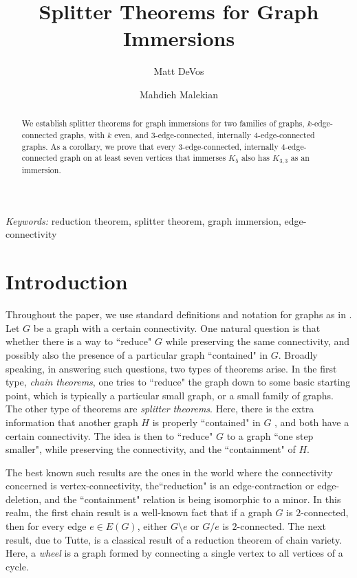 \documentclass[letterpaper,11pt]{article}
\title{Splitter Theorems for Graph Immersions}
\author{Matt DeVos
\and
Mahdieh Malekian}
\date{}
\theoremstyle{definition}
\begin{document}
\maketitle
\begin{abstract}
We establish splitter theorems for graph immersions for two families of graphs, $k$-edge-connected graphs, with $k$ even, and 3-edge-connected, internally 4-edge-connected graphs. As a corollary, we prove that every $3$-edge-connected, internally $4$-edge-connected graph on at least seven vertices that immerses $K_5$ also has $K_{3,3}$ as an immersion.
\end{abstract}

\vspace{0.7cm}
\noindent \emph{Keywords:} {reduction theorem, splitter theorem, graph immersion, edge-connectivity}


\section{Introduction}
\label{intro}


Throughout the paper, we use standard definitions and notation for graphs as in \cite{MR1367739}. Let $G$ be a graph with a certain connectivity. One natural question is that whether there is a way to ``reduce" $G$ while preserving the same connectivity, and possibly also the presence of a particular graph ``contained" in $G$. Broadly speaking, in answering such questions, two types of theorems arise. In the first type, \emph{chain theorems}, one tries to ``reduce" the graph down to some basic starting point, which is typically a particular small graph, or a small family of graphs. The other type of theorems are \emph{splitter theorems}. Here, there is the extra information that another graph $H$ is properly ``contained" in $G$ , and both have a certain connectivity. The idea is then to ``reduce" $G$ to a graph ``one step smaller", while preserving the connectivity, and the ``containment" of $H$.

The best known such results are the ones in the world where the connectivity concerned is vertex-connectivity, the``reduction" is an edge-contraction or edge-deletion, and the ``containment" relation is being isomorphic to a minor. In this realm, the first chain result is a well-known fact that if a graph $G$ is $2$-connected, then for every edge $e \in E(G)$, either $G\setminus e$ or $G/e$ is $2$-connected. The next result, due to Tutte, is a classical result of a reduction theorem of chain variety. Here, a \emph{wheel} is a graph formed by connecting a single vertex to all vertices of a cycle.
\end{document}
